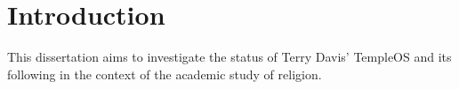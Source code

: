 \documentclass[Draft.tex]{subfiles}
\begin{document}
\chapter*{Introduction}

This dissertation aims to investigate the status of
Terry Davis' TempleOS and its following in the context
of the academic study of religion.
\end{document}
